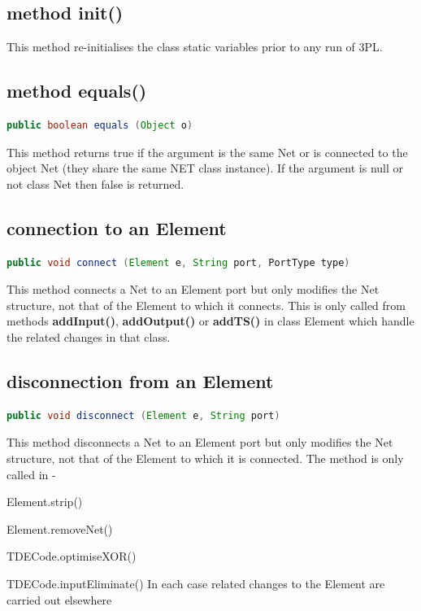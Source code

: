\subsection{method init()}

    This method re-initialises the class static variables prior
    to any run of 3PL.

\subsection{method equals()}

    \begin{lstlisting}[gobble=4, language=java]
        public boolean equals (Object o)
    \end{lstlisting}
    This method returns true if the argument is the same Net or
    is connected to the object Net (they share the same NET class
    instance). If the argument is null or not class Net then
    false is returned.

\subsection{connection to an Element}

    \begin{lstlisting}[gobble=4, language=java]
        public void connect (Element e, String port, PortType type)
    \end{lstlisting}
    This method connects a Net to an Element port but only modifies the
    Net structure, not that of the Element to which it connects. This is
    only called from methods {\bf addInput()}, {\bf addOutput()} or {\bf
    addTS()} in class Element which handle the related changes in that
    class.

\subsection{disconnection from an Element}

    \begin{lstlisting}[gobble=4, language=java]
        public void disconnect (Element e, String port)
    \end{lstlisting}
    This method disconnects a Net to an Element port but only modifies
    the Net structure, not that of the Element to which it is connected.
    The method is only called in -
    \blist
    \item   Element.strip()
    \item   Element.removeNet()
    \item   TDECode.optimiseXOR()
    \item   TDECode.inputEliminate()
    \blend
    In each case related changes to the Element are carried out
    elsewhere



